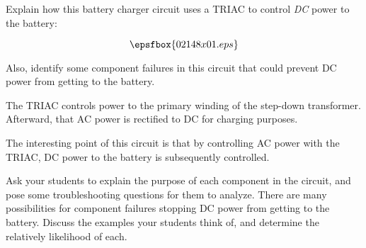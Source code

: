 

Explain how this battery charger circuit uses a TRIAC to control {\it DC} power to the battery:

$$\epsfbox{02148x01.eps}$$

Also, identify some component failures in this circuit that could prevent DC power from getting to the battery.







The TRIAC controls power to the primary winding of the step-down transformer.  Afterward, that AC power is rectified to DC for charging purposes.







The interesting point of this circuit is that by controlling AC power with the TRIAC, DC power to the battery is subsequently controlled.  

Ask your students to explain the purpose of each component in the circuit, and pose some troubleshooting questions for them to analyze.  There are many possibilities for component failures stopping DC power from getting to the battery.  Discuss the examples your students think of, and determine the relatively likelihood of each.




